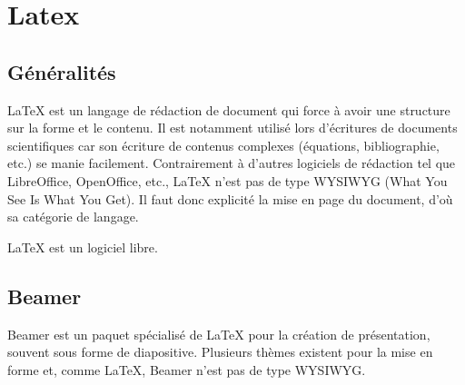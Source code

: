 \section{Latex}

\subsection{Généralités}
\LaTeX{} est un langage de rédaction de document qui force à avoir une structure sur la forme et le contenu. Il est notamment utilisé lors d'écritures de documents scientifiques car son écriture de contenus complexes (équations, bibliographie, etc.) se manie facilement.
Contrairement à d'autres logiciels de rédaction tel que LibreOffice, OpenOffice, etc., \LaTeX{} n'est pas de type WYSIWYG (What You See Is What You Get). Il faut donc explicité la mise en page du document, d'où sa catégorie de langage.

\LaTeX{} est un logiciel libre.

\subsection{Beamer}
Beamer est un paquet spécialisé de LaTeX pour la création de présentation, souvent sous forme de diapositive. Plusieurs thèmes existent pour la mise en forme et, comme \LaTeX{}, Beamer n'est pas de type WYSIWYG.

